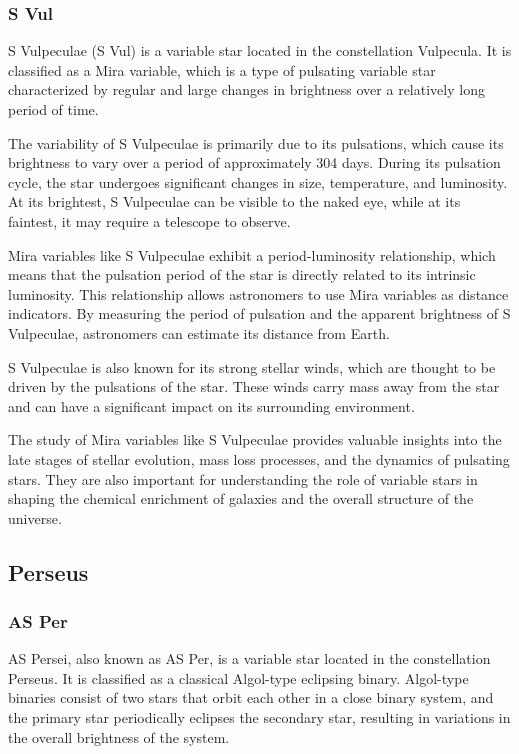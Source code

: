 \subsubsection*{ S Vul }
S Vulpeculae (S Vul) is a variable star located in the constellation Vulpecula. It is classified as a Mira variable, which is a type of pulsating variable star characterized by regular and large changes in brightness over a relatively long period of time.

The variability of S Vulpeculae is primarily due to its pulsations, which cause its brightness to vary over a period of approximately 304 days. During its pulsation cycle, the star undergoes significant changes in size, temperature, and luminosity. At its brightest, S Vulpeculae can be visible to the naked eye, while at its faintest, it may require a telescope to observe.

Mira variables like S Vulpeculae exhibit a period-luminosity relationship, which means that the pulsation period of the star is directly related to its intrinsic luminosity. This relationship allows astronomers to use Mira variables as distance indicators. By measuring the period of pulsation and the apparent brightness of S Vulpeculae, astronomers can estimate its distance from Earth.

S Vulpeculae is also known for its strong stellar winds, which are thought to be driven by the pulsations of the star. These winds carry mass away from the star and can have a significant impact on its surrounding environment.

The study of Mira variables like S Vulpeculae provides valuable insights into the late stages of stellar evolution, mass loss processes, and the dynamics of pulsating stars. They are also important for understanding the role of variable stars in shaping the chemical enrichment of galaxies and the overall structure of the universe.

\subsection{Perseus}

\subsubsection*{ AS Per }
AS Persei, also known as AS Per, is a variable star located in the constellation Perseus. It is classified as a classical Algol-type eclipsing binary. Algol-type binaries consist of two stars that orbit each other in a close binary system, and the primary star periodically eclipses the secondary star, resulting in variations in the overall brightness of the system.

